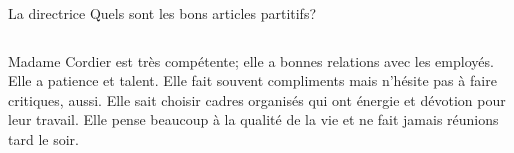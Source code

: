 \begin{frame}{La directrice}
  Quels sont les bons articles partitifs?
  \vspace{0.5cm}
  \begin{columns}
      Madame Cordier est très compétente; elle a \underline{} bonnes relations avec les employés.
      Elle a \underline{} patience et \underline{} talent.
      Elle fait souvent \underline{} compliments mais n'hésite pas à faire \underline{} critiques, aussi.
      Elle sait choisir \underline{} cadres organisés qui ont \underline{} énergie et \underline{} dévotion pour leur travail.
      Elle pense beaucoup à la qualité de la vie et ne fait jamais \underline{} réunions tard le soir.
  \end{columns}
\end{frame}